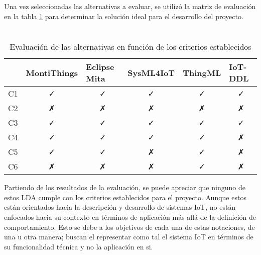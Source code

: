 Una vez seleccionadas las alternativas a evaluar, se utilizó la matriz de evaluación en la tabla \ref{tab:evaluation} para determinar la solución ideal para el desarrollo del proyecto. 

\skipline
\skipline
\skipline
\skipline

\begin{table}[H]
    \centering
    \caption{\\Evaluación de las alternativas en función de los criterios establecidos} \label{tab:evaluation}
    \begin{tabular}{cccccc}
    \hline
    \multicolumn{1}{l}{} &
      \multicolumn{1}{l}{MontiThings} &
      \multicolumn{1}{l}{Eclipse Mita} &
      \multicolumn{1}{l}{SysML4IoT} &
      \multicolumn{1}{l}{ThingML} &
      \multicolumn{1}{l}{IoT-DDL} \\ \hline
      C1 & ✓ & ✓ & ✓ & ✓ & ✓ \\
      C2 & ✗ & ✗ & ✗ & ✗ & ✗ \\
      C3 & ✓ & ✓ & ✓ & ✓ & ✓ \\
      C4 & ✓ & ✓ & ✓ & ✓ & ✗ \\
      C5 & ✓ & ✓ & ✗ & ✓ & ✗ \\
      C6 & ✗ & ✗ & ✗ & ✓ & ✗ \\ \hline
    \end{tabular}
\end{table}

Partiendo de los resultados de la evaluación, se puede apreciar que ninguno de estos LDA cumple con los criterios establecidos para el proyecto. Aunque estos están orientados hacia la descripción y desarrollo de sistemas IoT, no están enfocados hacia su contexto en términos de aplicación más allá de la definición de comportamiento. Esto se debe a los objetivos de cada una de estas notaciones, de una u otra manera; buscan el representar como tal el sistema IoT en términos de su funcionalidad técnica y no la aplicación en si. 